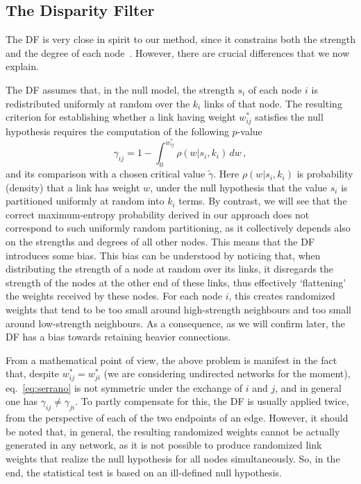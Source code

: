 \documentclass[aps,twocolumn,superscriptaddress]{revtex4-1}
\begin{document}
\subsection{The Disparity Filter}
The DF is very close in spirit to our method, since it constrains both the strength and the degree of each node~\cite{serrano-pnas-2009}. However, there are crucial differences that we now explain. 

The DF assumes that, in the null model, the strength $s_i$ of each node $i$ is redistributed uniformly at random over the $k_i$ links of that node.
The resulting criterion for establishing whether a link having weight $w_{ij}^{\ast}$ satisfies the null hypothesis requires the computation of the following $p$-value
\begin{equation}
%
\gamma_{ij} = 1 - \int_{0}^{w_{ij}^{\ast}} \rho(w|s_i,k_i) \, dw \,,
\label{eq:serrano}
\end{equation}
and its comparison with a chosen critical value $\widetilde{\gamma}$.
Here $\rho(w|s_i,k_i)$ is probability (density) that a link has weight $w$, under the null hypothesis that the value $s_i$ is partitioned uniformly at random into $k_i$ terms. 
By contrast, we will see that the correct maximum-entropy probability derived in our approach does not correspond to such uniformly random partitioning, as it collectively depends also on the strengths and degrees of all other nodes. This means that the DF introduces some bias. 
This bias can be understood by noticing that, when distributing the strength of a node at random over its links, it disregards the strength of the nodes at the other end of these links, thus effectively `flattening' the weights received by these nodes.
For each node $i$, this creates randomized weights that tend to be too small around high-strength neighbours and too small around low-strength neighbours.
As a consequence, as we will confirm later, the DF has a bias towards retaining heavier connections.

From a mathematical point of view, the above problem is manifest in the fact that, despite $w^\ast_{ij}=w^\ast_{ji}$ (we are considering undirected networks for the moment), eq.~\eqref{eq:serrano} is not symmetric under the exchange of $i$ and $j$, and in general one has $\gamma_{ij}\ne\gamma_{ji}$.
To partly compensate for this, the DF is usually applied twice, from the perspective of each of the two endpoints of an edge.
However, it should be noted that, in general, the resulting randomized weights cannot be actually generated in any network, as it is not possible to produce randomized link weights that realize the null hypothesis for all nodes simultaneously.
So, in the end, the statistical test is based on an ill-defined null hypothesis.
\end{document}
